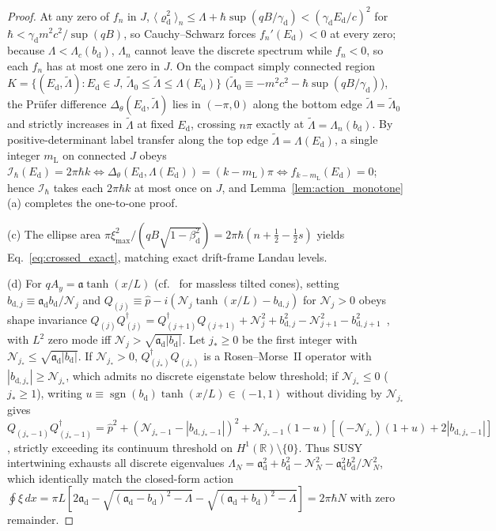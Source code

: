 \documentclass[aps,prd,onecolumn,tightenlines,nofootinbib,notitlepage,10pt,floatfix]{revtex4-2}
\theoremstyle{indentedtheorem}
\begin{document}
\begin{proof}
At any zero of $f_n$ in $J$, $\langle\varrho_\text{d}^2\rangle_n\le\Lambda+\hbar\sup(qB/\gamma_\text{d})<(\gamma_\text{d}E_\text{d}/c)^2$ for $\hbar<\gamma_\text{d}m^2 c^2/\sup(qB)$, so Cauchy--Schwarz forces $f_n'(E_\text{d})<0$ at every zero; because $\Lambda<\Lambda_c(b_\text{d})$, $\Lambda_n$ cannot leave the discrete spectrum while $f_n<0$, so each $f_n$ has at most one zero in $J$. On the compact simply connected region $K=\{(E_\text{d},\tilde{\Lambda}):E_\text{d}\in J,\,\tilde{\Lambda}_0\le\tilde{\Lambda}\le\Lambda(E_\text{d})\}$ ($\tilde{\Lambda}_0\equiv -m^2 c^2-\hbar\sup(qB/\gamma_\text{d})$), the Pr\"ufer difference $\Delta_\theta(E_\text{d},\tilde{\Lambda})$ lies in $(-\pi,0)$ along the bottom edge $\tilde{\Lambda}=\tilde{\Lambda}_0$ and strictly increases in $\tilde{\Lambda}$ at fixed $E_\text{d}$, crossing $n\pi$ exactly at $\tilde{\Lambda}=\Lambda_n(b_\text{d})$. By positive-determinant label transfer along the top edge $\tilde{\Lambda}=\Lambda(E_\text{d})$, a single integer $m_\text{L}$ on connected $J$ obeys $\mathcal{I}_\hbar(E_\text{d})=2\pi\hbar k\iff\Delta_\theta(E_\text{d},\Lambda(E_\text{d}))=(k-m_\text{L})\pi\iff f_{k-m_\text{L}}(E_\text{d})=0$; hence $\mathcal{I}_\hbar$ takes each $2\pi\hbar k$ at most once on $J$, and Lemma~\ref{lem:action_monotone}(a) completes the one-to-one proof.

(c) The ellipse area $\pi\xi_{\max}^2/(qB\sqrt{1-\beta_\text{d}^2})=2\pi\hbar(n+\tfrac{1}{2}-\tfrac{1}{2}s)$ yields Eq.~\eqref{eq:crossed_exact}, matching exact drift-frame Landau levels.

(d) For $qA_y=\mathfrak{a}\tanh(x/L)$ (cf.\ \citep{OCampa2025Spectral} for massless tilted cones), setting $b_{\text{d},j}\equiv\mathfrak{a}_\text{d}b_\text{d}/\mathcal{N}_j$ and $Q_{(j)}\equiv\hat{p}-i(\mathcal{N}_j\tanh(x/L)-b_{\text{d},j})$ for $\mathcal{N}_j>0$ obeys shape invariance $Q_{(j)}Q_{(j)}^\dagger=Q_{(j+1)}^\dagger Q_{(j+1)}+\mathcal{N}_j^2+b_{\text{d},j}^2-\mathcal{N}_{j+1}^2-b_{\text{d},j+1}^2$~\citep{CooperKhareSukhatme1995Supersymmetry}, with $L^2$ zero mode iff $\mathcal{N}_j>\sqrt{\mathfrak{a}_\text{d}|b_\text{d}|}$. Let $j_*\ge 0$ be the first integer with $\mathcal{N}_{j_*}\le\sqrt{\mathfrak{a}_\text{d}|b_\text{d}|}$. If $\mathcal{N}_{j_*}>0$, $Q_{(j_*)}^\dagger Q_{(j_*)}$ is a Rosen--Morse~II operator with $|b_{\text{d},j_*}|\ge\mathcal{N}_{j_*}$, which admits no discrete eigenstate below threshold; if $\mathcal{N}_{j_*}\le 0$ ($j_*\ge 1$), writing $u\equiv\operatorname{sgn}(b_\text{d})\tanh(x/L)\in(-1,1)$ without dividing by $\mathcal{N}_{j_*}$ gives $Q_{(j_*-1)}Q_{(j_*-1)}^\dagger=\hat{p}^2+(\mathcal{N}_{j_*-1}-|b_{\text{d},j_*-1}|)^2+\mathcal{N}_{j_*-1}(1-u)[(-\mathcal{N}_{j_*})(1+u)+2|b_{\text{d},j_*-1}|]$, strictly exceeding its continuum threshold on $H^1(\mathbb{R})\setminus\{0\}$. Thus SUSY intertwining exhausts all discrete eigenvalues $\Lambda_N=\mathfrak{a}_\text{d}^2+b_\text{d}^2-\mathcal{N}_N^2-\mathfrak{a}_\text{d}^2 b_\text{d}^2/\mathcal{N}_N^2$, which identically match the closed-form action $\oint\xi\,dx=\pi L[2\mathfrak{a}_\text{d}-\sqrt{(\mathfrak{a}_\text{d}-b_\text{d})^2-\Lambda}-\sqrt{(\mathfrak{a}_\text{d}+b_\text{d})^2-\Lambda}]=2\pi\hbar N$ with zero remainder.
\end{proof}
\end{document}
